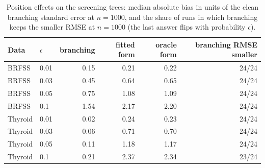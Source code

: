 \begin{table}[h]
\centering
\caption{Position effects on the screening trees: median absolute bias in units of the clean branching standard error at $n=1000$, and the share of runs in which branching keeps the smaller RMSE at $n=1000$ (the last answer flips with probability $\epsilon$).}
\label{tab:position}
\small
\begin{tabular}{llrrrr}
\toprule
Data & $\epsilon$ & branching & fitted form & oracle form & branching RMSE smaller \\
\midrule
BRFSS & 0.01 & 0.15 & 0.21 & 0.22 & 24/24 \\
BRFSS & 0.03 & 0.45 & 0.64 & 0.65 & 24/24 \\
BRFSS & 0.05 & 0.75 & 1.08 & 1.09 & 24/24 \\
BRFSS & 0.1 & 1.54 & 2.17 & 2.20 & 24/24 \\
Thyroid & 0.01 & 0.02 & 0.24 & 0.23 & 24/24 \\
Thyroid & 0.03 & 0.06 & 0.71 & 0.70 & 24/24 \\
Thyroid & 0.05 & 0.11 & 1.18 & 1.17 & 24/24 \\
Thyroid & 0.1 & 0.21 & 2.37 & 2.34 & 23/24 \\
\bottomrule
\end{tabular}
\end{table}
